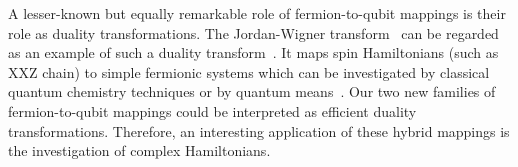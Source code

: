 A lesser-known but equally remarkable role of fermion-to-qubit mappings is their role as duality transformations. The Jordan-Wigner transform~\cite{jordan1993paulische} can be regarded as an example of such a duality transform~\cite{henderson2022strong}. It maps spin Hamiltonians (such as XXZ chain) to simple fermionic systems which can be investigated by classical quantum chemistry techniques or by quantum means~\cite{nishimori2010elements,cao2019quantum}. Our two new families of fermion-to-qubit mappings could be interpreted as efficient duality transformations. Therefore, an interesting application of these hybrid mappings is the investigation of complex Hamiltonians.




